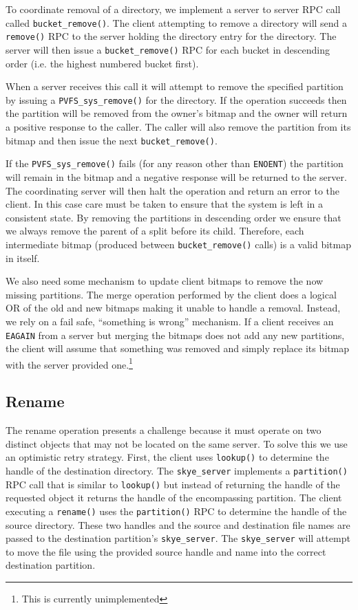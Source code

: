 \documentclass[twocolumn,letterpaper]{article}
\newcommand{\code}[1]{\texttt{#1}}
\begin{document}
To coordinate removal of a directory, we implement a server to server RPC call
called \code{bucket\_\-remove()}.  The client attempting to remove a directory will send a
\code{remove()} RPC to the server holding the directory entry for the directory.  The
server will then issue a \code{bucket\_\-remove()} RPC for each bucket in descending order
(i.e. the highest numbered bucket first).  

When a server receives this call it will attempt to remove the specified
partition by issuing a \code{PVFS\_\-sys\_\-remove()} for the directory.  If the operation
succeeds then the partition will be removed from the owner's bitmap and the
owner will return a positive response to the caller.  The caller will also
remove the partition from its bitmap and then issue the next
\code{bucket\_\-remove()}.

If the \code{PVFS\_\-sys\_\-remove()} fails (for any reason other than \code{ENOENT}) the partition
will remain in the bitmap and a negative response will be returned to the
server.  The coordinating server will then halt the operation and return an
error to the client.  In this case care must be taken to ensure that the system
is left in a consistent state.  By removing the partitions in descending order
we ensure that we always remove the parent of a split before its child.
Therefore, each intermediate bitmap (produced between
\code{bucket\_\-remove()} calls) is
a valid bitmap in itself.

We also need some mechanism to update client bitmaps to remove the now missing
partitions.  The merge operation performed by the client does a logical
OR of the old and new bitmaps making it unable to handle a removal.  Instead, we
rely on a fail safe, ``something is wrong'' mechanism.  If a client receives an
\code{EAGAIN} from a server but merging the bitmaps does not add any new partitions,
the client will assume that something was removed and simply replace its bitmap
with the server provided one.\footnote{This is currently unimplemented}

\subsection{Rename}
The rename operation presents a challenge because it must operate on two distinct
objects that may not be located on the same server.  To solve this we use an
optimistic retry strategy.  First, the client uses \code{lookup()} to determine the
handle of the destination directory.  The \code{skye\_\-server} implements a
\code{partition()}
RPC call that is similar to \code{lookup()} but instead of returning the handle of the
requested object it returns the handle of the encompassing partition.  The
client executing a \code{rename()} uses the \code{partition()} RPC to determine the handle of
the source directory.  These two handles and the source and destination file
names are passed to the destination partition's \code{skye\_\-server}.  The \code{skye\_\-server}
will attempt to move the file using the provided source handle and name into the
correct destination partition.  
\end{document}
